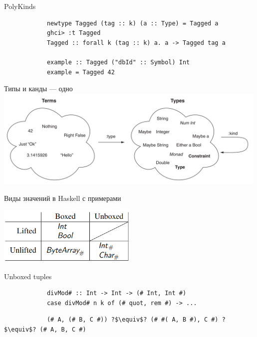     \begin{frame}[fragile]{PolyKinds}
        \pause
        \begin{verbatim}
            newtype Tagged (tag :: k) (a :: Type) = Tagged a
            ghci> :t Tagged
            Tagged :: forall k (tag :: k) a. a -> Tagged tag a

            example :: Tagged ("dbId" :: Symbol) Int
            example = Tagged 42
        \end{verbatim}
    \end{frame}

    \begin{frame}[fragile]{Типы и канды --- одно}
        \pause
        \includegraphics[width=0.99\textwidth]{figs/types-eq-kinds}
    \end{frame}



    \begin{frame}[fragile]{Виды значений в Haskell с примерами}
        \pause
        \begin{center}
            \includegraphics[width=0.5\textwidth]{figs/haskell-value-kinds}
        \end{center}
    \end{frame}

    \begin{frame}[fragile]{Unboxed tuples}
         \pause
         \begin{verbatim}
            divMod# :: Int -> Int -> (# Int, Int #)
            case divMod# n k of (# quot, rem #) -> ...
         \end{verbatim}

        \pause\hspace{2em}
         \begin{verbatim}
            (# A, (# B, C #)) ?$\equiv$? (# #( A, B #), C #) ?$\equiv$? (# A, B, C #)
         \end{verbatim}
    \end{frame}

